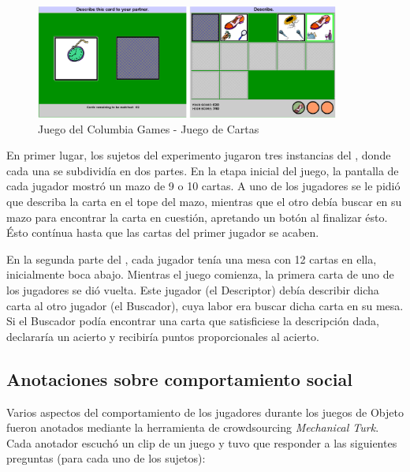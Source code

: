 \subsection{\cardgame}
\begin{figure}
\centering
\includegraphics[width=10cm]{images/columbia_games_card_game.png}
\caption{Juego del Columbia Games - Juego de Cartas}
\label{tablero_columbia_games}
\end{figure}


En primer lugar, los sujetos del experimento jugaron tres instancias del \cardgame, donde cada una se subdividía en dos partes. En la etapa inicial del juego, la pantalla de cada jugador mostró un mazo de 9 o 10 cartas. A uno de los jugadores se le pidió que describa la carta en el tope del mazo, mientras que el otro debía buscar en su mazo para encontrar la carta en cuestión, apretando un botón al finalizar ésto. Ésto contínua hasta que las cartas del primer jugador se acaben.


En la segunda parte del \cardgame, cada jugador tenía una mesa con 12 cartas en ella, inicialmente boca abajo. Mientras el juego comienza, la primera carta de uno de los jugadores se dió vuelta. Este jugador (el Descriptor) debía describir dicha carta al otro jugador (el Buscador), cuya labor era buscar dicha carta en su mesa. Si el Buscador podía encontrar una carta que satisficiese la descripción dada, declararía un acierto y recibiría puntos proporcionales al acierto.


\subsection{Anotaciones sobre comportamiento social}

Varios aspectos del comportamiento de los jugadores durante los juegos de Objeto fueron anotados mediante la herramienta de crowdsourcing \emph{Mechanical Turk}. Cada anotador escuchó un clip de un juego y tuvo que responder a las siguientes preguntas (para cada uno de los sujetos):


